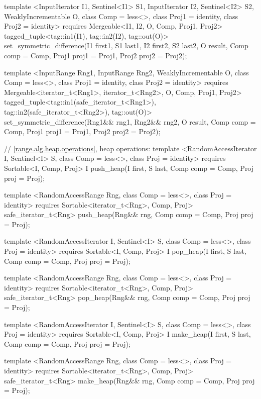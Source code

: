 {\begin{codeblock}
{{    template <InputIterator I1, Sentinel<I1> S1, InputIterator I2, Sentinel<I2> S2,
        WeaklyIncrementable O, class Comp = less<>, class Proj1 = identity, class Proj2 = identity>
      requires Mergeable<I1, I2, O, Comp, Proj1, Proj2>
      tagged_tuple<tag::in1(I1), tag::in2(I2), tag::out(O)>
        set_symmetric_difference(I1 first1, S1 last1, I2 first2, S2 last2, O result,
                                 Comp comp = Comp{}, Proj1 proj1 = Proj1{},
                                 Proj2 proj2 = Proj2{});

    template <InputRange Rng1, InputRange Rng2, WeaklyIncrementable O,
        class Comp = less<>, class Proj1 = identity, class Proj2 = identity>
      requires Mergeable<iterator_t<Rng1>, iterator_t<Rng2>, O, Comp, Proj1, Proj2>
      tagged_tuple<tag::in1(safe_iterator_t<Rng1>),
                   tag::in2(safe_iterator_t<Rng2>),
                   tag::out(O)>
        set_symmetric_difference(Rng1&& rng1, Rng2&& rng2, O result, Comp comp = Comp{},
                                 Proj1 proj1 = Proj1{}, Proj2 proj2 = Proj2{});

    // \ref{range.alg.heap.operations}, heap operations:
    template <RandomAccessIterator I, Sentinel<I> S, class Comp = less<>,
        class Proj = identity>
      requires Sortable<I, Comp, Proj>
      I push_heap(I first, S last, Comp comp = Comp{}, Proj proj = Proj{});

    template <RandomAccessRange Rng, class Comp = less<>, class Proj = identity>
      requires Sortable<iterator_t<Rng>, Comp, Proj>
      safe_iterator_t<Rng>
        push_heap(Rng&& rng, Comp comp = Comp{}, Proj proj = Proj{});

    template <RandomAccessIterator I, Sentinel<I> S, class Comp = less<>,
        class Proj = identity>
      requires Sortable<I, Comp, Proj>
      I pop_heap(I first, S last, Comp comp = Comp{}, Proj proj = Proj{});

    template <RandomAccessRange Rng, class Comp = less<>, class Proj = identity>
      requires Sortable<iterator_t<Rng>, Comp, Proj>
      safe_iterator_t<Rng>
        pop_heap(Rng&& rng, Comp comp = Comp{}, Proj proj = Proj{});

    template <RandomAccessIterator I, Sentinel<I> S, class Comp = less<>,
        class Proj = identity>
      requires Sortable<I, Comp, Proj>
      I make_heap(I first, S last, Comp comp = Comp{}, Proj proj = Proj{});

    template <RandomAccessRange Rng, class Comp = less<>, class Proj = identity>
      requires Sortable<iterator_t<Rng>, Comp, Proj>
      safe_iterator_t<Rng>
        make_heap(Rng&& rng, Comp comp = Comp{}, Proj proj = Proj{});

}}
\end{codeblock}}
